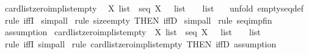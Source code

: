 \begin{isabellebody}
\ card{\isacharunderscore}list{\isacharunderscore}zero{\isacharunderscore}imp{\isacharunderscore}list{\isacharunderscore}empty{\isacharcolon}\ \isanewline
{\isachardoublequoteopen}{\isacharbang}{\isacharbang}\ X{\isachardot}\ list\ {\isacharcolon}\ seq\ X\ {\isacharequal}{\isacharequal}{\isachargreater}\ {\isacharparenleft}{\isacharhash}\ list\ {\isacharequal}\ {}{\isacharparenright}\ {\isacharequal}\ {\isacharparenleft}list\ {\isacharequal}\ {\isacharpercent}{\isacharless}{\isacharpercent}{\isachargreater}{\isacharparenright}{\isachardoublequoteclose}\isanewline
%
\isadelimproof
%
\endisadelimproof
%
\isatagproof
{}\isamarkupfalse%
\ {\isacharparenleft}unfold\ emptyseq{\isacharunderscore}def{\isacharparenright}\isanewline
{}\isamarkupfalse%
\ {\isacharparenleft}rule\ iffI{\isacharparenright}\isanewline
{}\isamarkupfalse%
\ simp{\isacharunderscore}all\isanewline
{}\isamarkupfalse%
\ {\isacharparenleft}rule\ size{\isacharunderscore}empty{}\ {\isacharbrackleft}THEN\ iffD{}{\isacharbrackright}{\isacharparenright}\isanewline
{}\isamarkupfalse%
\ simp{\isacharunderscore}all\isanewline
{}\isamarkupfalse%
\ {\isacharparenleft}rule\ seq{\isacharunderscore}imp{\isacharunderscore}fin{\isacharparenright}\ \isanewline
{}\isamarkupfalse%
\ {\isacharparenleft}assumption{\isacharparenright}\isanewline
{}\isamarkupfalse%
%
\endisatagproof
{\isafoldproof}%
%
\isadelimproof
\isanewline
%
\endisadelimproof
\isanewline
{}\isamarkupfalse%
\ card{\isacharunderscore}list{\isacharunderscore}zero{\isacharunderscore}imp{\isacharunderscore}list{\isacharunderscore}empty{}{\isacharcolon}\ {\isachardoublequoteopen}{\isacharbang}{\isacharbang}\ X{\isachardot}\ list\ {\isacharcolon}\ seq\ X\ {\isacharequal}{\isacharequal}{\isachargreater}\ {\isacharparenleft}{\isacharhash}\ list\ {\isacharless}{\isacharequal}\ {}{\isacharparenright}\ {\isacharequal}\ {\isacharparenleft}list\ {\isacharequal}\ {\isacharpercent}{\isacharless}{\isacharpercent}{\isachargreater}{\isacharparenright}{\isachardoublequoteclose}\isanewline
%
\isadelimproof
%
\endisadelimproof
%
\isatagproof
{}\isamarkupfalse%
\ {\isacharparenleft}rule\ iffI{\isacharcomma}\ simp{\isacharunderscore}all{\isacharparenright}\isanewline
{}\isamarkupfalse%
\ {\isacharparenleft}rule\ card{\isacharunderscore}list{\isacharunderscore}zero{\isacharunderscore}imp{\isacharunderscore}list{\isacharunderscore}empty\ {\isacharbrackleft}THEN\ iffD{}{\isacharbrackright}{\isacharcomma}\ assumption{\isacharparenright}\isanewline

\end{isabellebody}
